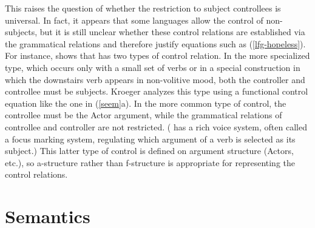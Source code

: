 This raises the question of whether the restriction to subject controllees is universal. In fact, it appears that some languages allow the control of non-subjects, but it is still unclear whether these control relations are established via the grammatical relations and therefore justify equations such as (\ref{lfg-hopeless}).  For instance, \citet{kroeger:1993} shows that  has two types of control relation.  In the more specialized type, which occurs only with a small set of verbs or in a special construction in which the downstairs verb appears in non-volitive mood, both the controller and controllee must be subjects.  Kroeger analyzes this type using a functional control equation like the one in (\ref{seem}a).  In the more common type of  control, the controllee must be the Actor argument, while the grammatical relations of controllee and controller are not restricted.  ( has a rich voice system, often called a focus marking system, regulating which argument of a verb is selected as its subject.)  This latter type of  control is defined on argument structure (Actors, etc.), so a-structure rather than f-structure is appropriate for representing the control relations.



\section{Semantics}


